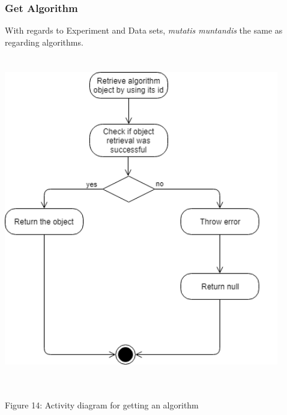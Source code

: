     \subsubsection{Get Algorithm}
    \par With regards to Experiment and Data sets,
{ \textit{mutatis muntandis} the same as regarding algorithms.} \newline \newline
    \includegraphics[width=12cm,height=15cm,keepaspectratio]{input_unit/images/get_algorithm_activity_diagram.png}
	\begin{center}
	    \small{Figure 14: Activity diagram for getting an algorithm }
    \end{center}
    \newpage
